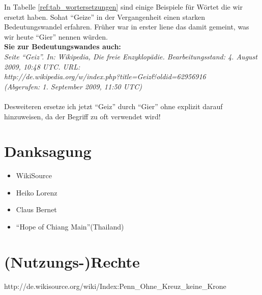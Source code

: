 In Tabelle \ref{ref:tab_wortersetzungen} sind einige Beispiele für Wörtet die wir
ersetzt haben. Sohat "`Geize"' in der Vergangenheit einen starken Bedeutungswandel erfahren. Früher war in erster liene das damit gemeint, was wir heute "`Gier"' nennen würden.
\\ \textbf{Sie zur Bedeutungswandes auch:}
\\ \textit{Seite "`Geiz"'. In: Wikipedia, Die freie Enzyklopädie. Bearbeitungsstand: 4. August 2009, 10:48 UTC. URL:
\\ http://de.wikipedia.org/w/index.php?title=Geiz\&oldid=62956916
\\ (Abgerufen: 1. September 2009, 11:50 UTC) }
\\ \\ Desweiteren ersetze ich jetzt "`Geiz"' durch "`Gier"' ohne explizit darauf hinzuweisen, da der Begriff zu oft verwendet wird!
	


\chapter{Danksagung}

\begin{itemize}
 \item WikiSource
 \item Heiko Lorenz
 \item Claus Bernet
 \item "`Hope of Chiang Main"'(Thailand)
\end{itemize}


\chapter{(Nutzungs-)Rechte}
http://de.wikisource.org/wiki/Index:Penn\_Ohne\_Kreuz\_keine\_Krone
